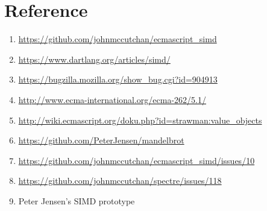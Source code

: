 \documentclass[12pt]{article} %
\begin{document}
\section{Reference}
\begin{enumerate}
  \item \href{https://github.com/johnmccutchan/ecmascript\_simd}{https://github.com/johnmccutchan/ecmascript\_simd}
  \item \href{https://www.dartlang.org/articles/simd/}{https://www.dartlang.org/articles/simd/}
  \item \href{https://bugzilla.mozilla.org/show\_bug.cgi?id=904913}{https://bugzilla.mozilla.org/show\_bug.cgi?id=904913}
  \item \href{http://www.ecma-international.org/ecma-262/5.1/}{http://www.ecma-international.org/ecma-262/5.1/}
  \item \href{http://wiki.ecmascript.org/doku.php?id=strawman:value\_objects}{http://wiki.ecmascript.org/doku.php?id=strawman:value\_objects}
  \item \href{https://github.com/PeterJensen/mandelbrot}{https://github.com/PeterJensen/mandelbrot}
  \item \href{https://github.com/johnmccutchan/ecmascript\_simd/issues/10}{https://github.com/johnmccutchan/ecmascript\_simd/issues/10}
  \item \href{https://github.com/johnmccutchan/spectre/issues/118}{https://github.com/johnmccutchan/spectre/issues/118}
  \item Peter Jensen’s SIMD prototype
\end{enumerate}
\end{document}
